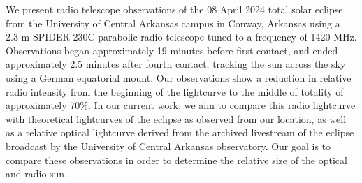 We present radio telescope observations of the 08 April 2024 total solar eclipse from the University of Central Arkansas campus in Conway, Arkansas using a 2.3-m SPIDER 230C parabolic radio telescope tuned to a frequency of 1420 MHz.
Observations began approximately 19 minutes before first contact, and ended approximately 2.5 minutes after fourth contact, tracking the sun across the sky using a German equatorial mount.
Our observations show a reduction in relative radio intensity from the beginning of the lightcurve to the middle of totality of approximately 70\%.
In our current work, we aim to compare this radio lightcurve with theoretical lightcurves of the eclipse as observed from our location, as well as a relative optical lightcurve derived from the archived livestream of the eclipse broadcast by the University of Central Arkansas observatory.
Our goal is to compare these observations in order to determine the relative size of the optical and radio sun.

